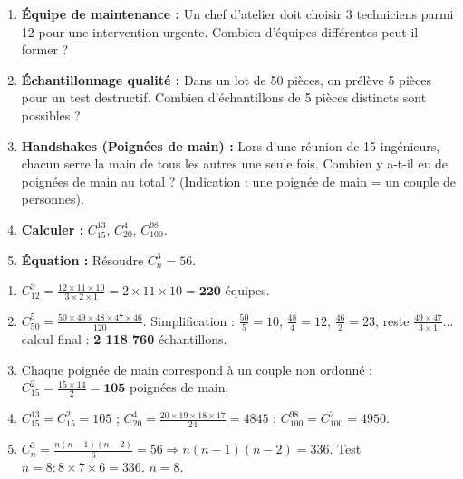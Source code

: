 \documentclass[11pt]{article}
\begin{document}
\begin{exercice}
\begin{enumerate}
    \item \textbf{Équipe de maintenance :} Un chef d'atelier doit choisir 3 techniciens parmi 12 pour une intervention urgente. Combien d'équipes différentes peut-il former ?
    \item \textbf{Échantillonnage qualité :} Dans un lot de 50 pièces, on prélève 5 pièces pour un test destructif. Combien d'échantillons de 5 pièces distincts sont possibles ?
    \item \textbf{Handshakes (Poignées de main) :} Lors d'une réunion de 15 ingénieurs, chacun serre la main de tous les autres une seule fois. Combien y a-t-il eu de poignées de main au total ? (Indication : une poignée de main = un couple de personnes).
    \item \textbf{Calculer :} $C_{15}^{13}$, $C_{20}^{4}$, $C_{100}^{98}$.
    \item \textbf{Équation :} Résoudre $C_n^3 = 56$.
\end{enumerate}
\end{exercice}

\begin{corrige}[Exercice n°4]
\begin{enumerate}
    \item $C_{12}^3 = \frac{12 \times 11 \times 10}{3 \times 2 \times 1} = 2 \times 11 \times 10 = \textbf{220}$ équipes.
    \item $C_{50}^5 = \frac{50 \times 49 \times 48 \times 47 \times 46}{120}$. Simplification : $\frac{50}{5}=10$, $\frac{48}{4}=12$, $\frac{46}{2}=23$, reste $\frac{49 \times 47}{3 \times 1}$... calcul final : \textbf{2 118 760} échantillons.
    \item Chaque poignée de main correspond à un couple non ordonné : $C_{15}^2 = \frac{15 \times 14}{2} = \textbf{105}$ poignées de main.
    \item $C_{15}^{13} = C_{15}^2 = 105$ ; $C_{20}^4 = \frac{20 \times 19 \times 18 \times 17}{24} = 4845$ ; $C_{100}^{98} = C_{100}^2 = 4950$.
    \item $C_n^3 = \frac{n(n-1)(n-2)}{6} = 56 \Rightarrow n(n-1)(n-2) = 336$. Test $n=8 : 8 \times 7 \times 6 = 336$. \textbf{$n=8$}.
\end{enumerate}
\end{corrige}
\end{document}
